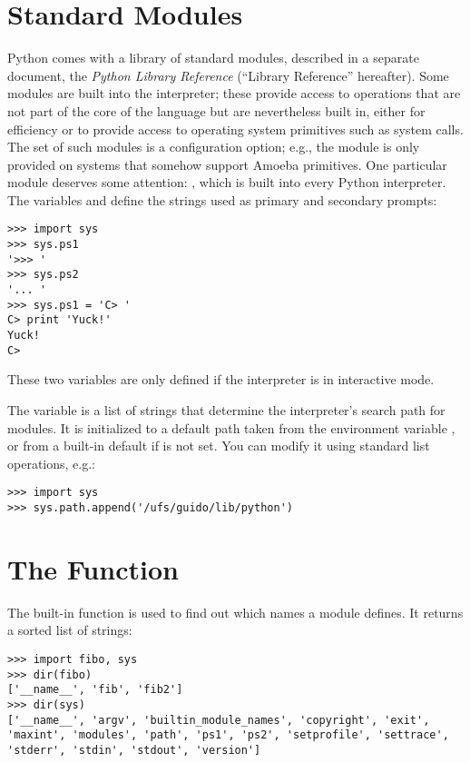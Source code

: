 \documentclass{manual}
\begin{document}
\section{Standard Modules \label{standardModules}}

Python comes with a library of standard modules, described in a separate
document, the \emph{Python Library Reference} (``Library Reference''
hereafter).  Some modules are built into the interpreter; these
provide access to operations that are not part of the core of the
language but are nevertheless built in, either for efficiency or to
provide access to operating system primitives such as system calls.
The set of such modules is a configuration option; e.g., the
 module is  only provided on systems that somehow
support Amoeba primitives.  One particular module deserves some
attention: , which is built into every
Python interpreter.  The variables  and
 define the strings used as primary and secondary
prompts:

\begin{verbatim}
>>> import sys
>>> sys.ps1
'>>> '
>>> sys.ps2
'... '
>>> sys.ps1 = 'C> '
C> print 'Yuck!'
Yuck!
C> 
\end{verbatim}

These two variables are only defined if the interpreter is in
interactive mode.

The variable  is a list of strings that determine the
interpreter's search path for modules. It is initialized to a default
path taken from the environment variable , or from
a built-in default if  is not set.  You can modify
it using standard list operations, e.g.: 

\begin{verbatim}
>>> import sys
>>> sys.path.append('/ufs/guido/lib/python')
\end{verbatim}

\section{The  Function \label{dir}}

The built-in function  is used to find out which names
a module defines.  It returns a sorted list of strings:

\begin{verbatim}
>>> import fibo, sys
>>> dir(fibo)
['__name__', 'fib', 'fib2']
>>> dir(sys)
['__name__', 'argv', 'builtin_module_names', 'copyright', 'exit',
'maxint', 'modules', 'path', 'ps1', 'ps2', 'setprofile', 'settrace',
'stderr', 'stdin', 'stdout', 'version']
\end{verbatim}
\end{document}
